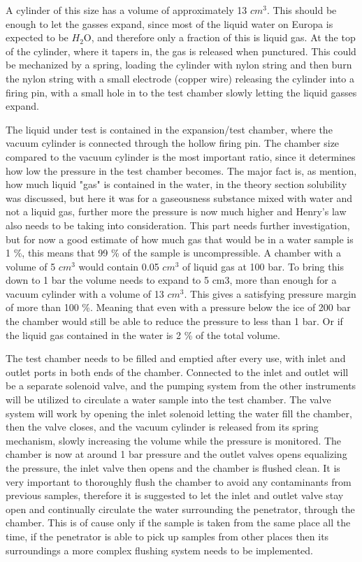A cylinder of this size has a volume of approximately 13 $cm^3$. This should be enough to let the gasses expand, since most of the liquid water on Europa is expected to be $H_2$O\cite{EuropasOcean}, and therefore only a fraction of this is liquid gas. At the top of the cylinder, where it tapers in, the gas is released when punctured. This could be mechanized by a spring, loading the cylinder with nylon string and then burn the nylon string with a small electrode (copper wire) releasing the cylinder into a firing pin, with a small hole in to the test chamber slowly letting the liquid gasses expand.

The liquid under test is contained in the expansion/test chamber, where the vacuum cylinder is connected through the hollow firing pin. The chamber size compared to the vacuum cylinder is the most important ratio, since it determines how low the pressure in the test chamber becomes. The major fact is, as mention, how much liquid "gas" is contained in the water, in the theory section solubility was discussed, but here it was for a gaseousness substance mixed with water and not a liquid gas, further more the pressure is now much higher and Henry's law also needs to be taking into consideration. This part needs further investigation, but for now a good estimate of how much gas that would be in a water sample is 1 \%, this means that 99 \% of the sample is uncompressible. A chamber with a volume of 5 $cm^3$ would contain 0.05 $cm^3$ of liquid gas at 100 bar. To bring this down to 1 bar the volume needs to expand to 5 cm3, more than enough for a vacuum cylinder with a volume of 13 $cm^3$. This gives a satisfying pressure margin of more than 100 \%. Meaning that even with a pressure below the ice of 200 bar the chamber would still be able to reduce the pressure to less than 1 bar. Or if the liquid gas contained in the water is 2 \% of the total volume.

The test chamber needs to be filled and emptied after every use, with inlet and outlet ports in both ends of the chamber. Connected to the inlet and outlet will be a separate solenoid valve, and the pumping system from the other instruments will be utilized to circulate a water sample into the test chamber. The valve system will work by opening the inlet solenoid letting the water fill the chamber, then the valve closes, and the vacuum cylinder is released from its spring mechanism, slowly increasing the volume while the pressure is monitored. The chamber is now at around 1 bar pressure and the outlet valves opens equalizing the pressure, the inlet valve then opens and the chamber is flushed clean. It is very important to thoroughly flush the chamber to avoid any contaminants from previous samples, therefore it is suggested to let the inlet and outlet valve stay open and continually circulate the water surrounding the penetrator, through the chamber. This is of cause only if the sample is taken from the same place all the time, if the penetrator is able to pick up samples from other places then its surroundings a more complex flushing system needs to be implemented.

